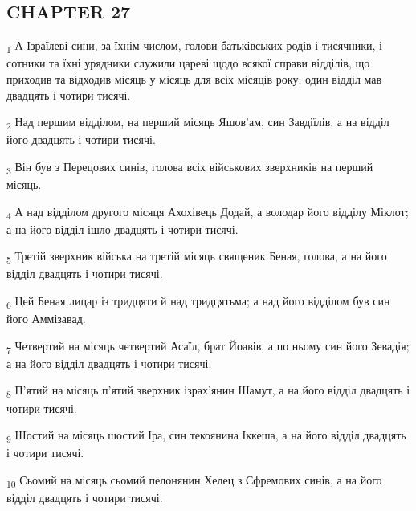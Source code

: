 \subsection{CHAPTER 27}
\begin{tcolorbox}
\textsubscript{1} А Ізраїлеві сини, за їхнім числом, голови батьківських родів і тисячники, і сотники та їхні урядники служили цареві щодо всякої справи відділів, що приходив та відходив місяць у місяць для всіх місяців року; один відділ мав двадцять і чотири тисячі.
\end{tcolorbox}
\begin{tcolorbox}
\textsubscript{2} Над першим відділом, на перший місяць Яшов'ам, син Завдіїлів, а на відділ його двадцять і чотири тисячі.
\end{tcolorbox}
\begin{tcolorbox}
\textsubscript{3} Він був з Перецових синів, голова всіх військових зверхників на перший місяць.
\end{tcolorbox}
\begin{tcolorbox}
\textsubscript{4} А над відділом другого місяця Ахохівець Додай, а володар його відділу Міклот; а на його відділ ішло двадцять і чотири тисячі.
\end{tcolorbox}
\begin{tcolorbox}
\textsubscript{5} Третій зверхник війська на третій місяць священик Беная, голова, а на його відділ двадцять і чотири тисячі.
\end{tcolorbox}
\begin{tcolorbox}
\textsubscript{6} Цей Беная лицар із тридцяти й над тридцятьма; а над його відділом був син його Аммізавад.
\end{tcolorbox}
\begin{tcolorbox}
\textsubscript{7} Четвертий на місяць четвертий Асаїл, брат Йоавів, а по ньому син його Зевадія; а на його відділ двадцять і чотири тисячі.
\end{tcolorbox}
\begin{tcolorbox}
\textsubscript{8} П'ятий на місяць п'ятий зверхник ізрах'янин Шамут, а на його відділ двадцять і чотири тисячі.
\end{tcolorbox}
\begin{tcolorbox}
\textsubscript{9} Шостий на місяць шостий Іра, син текоянина Іккеша, а на його відділ двадцять і чотири тисячі.
\end{tcolorbox}
\begin{tcolorbox}
\textsubscript{10} Сьомий на місяць сьомий пелонянин Хелец з Єфремових синів, а на його відділ двадцять і чотири тисячі.
\end{tcolorbox}
